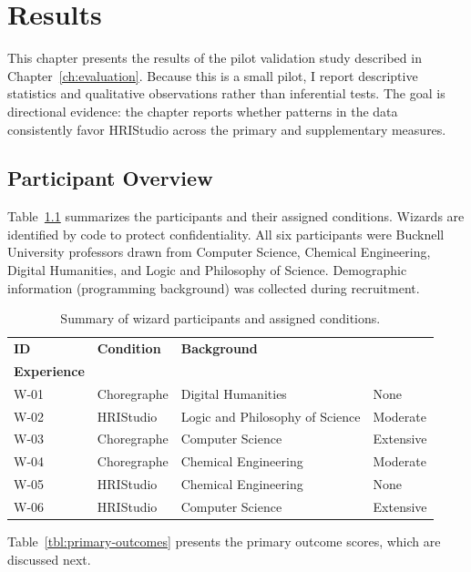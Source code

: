 \chapter{Results}
\label{ch:results}

This chapter presents the results of the pilot validation study described in Chapter~\ref{ch:evaluation}. Because this is a small pilot, I report descriptive statistics and qualitative observations rather than inferential tests. The goal is directional evidence: the chapter reports whether patterns in the data consistently favor HRIStudio across the primary and supplementary measures.

\section{Participant Overview}

Table~\ref{tbl:sessions} summarizes the participants and their assigned conditions. Wizards are identified by code to protect confidentiality. All six participants were Bucknell University professors drawn from Computer Science, Chemical Engineering, Digital Humanities, and Logic and Philosophy of Science. Demographic information (programming background) was collected during recruitment.


\begin{table}[htbp]
\centering
\footnotesize
\begin{tabular}{|l|l|l|l|}
\hline
\textbf{ID} & \textbf{Condition} & \textbf{Background} & \makecell[l]{\textbf{Programming}\\\textbf{Experience}} \\
\hline
W-01 & Choregraphe & Digital Humanities & None \\
\hline
W-02 & HRIStudio & Logic and Philosophy of Science & Moderate \\
\hline
W-03 & Choregraphe & Computer Science & Extensive \\
\hline
W-04 & Choregraphe & Chemical Engineering & Moderate \\
\hline
W-05 & HRIStudio & Chemical Engineering & None \\
\hline
W-06 & HRIStudio & Computer Science & Extensive \\
\hline
\end{tabular}
\caption{Summary of wizard participants and assigned conditions.}
\label{tbl:sessions}
\end{table}

Table~\ref{tbl:primary-outcomes} presents the primary outcome scores, which are discussed next.

